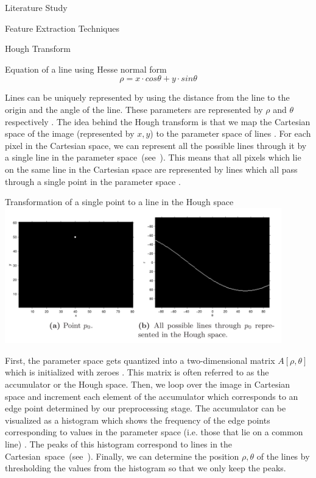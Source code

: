 \documentclass{matthijs}
\begin{document}
\begin{hoofdstuk}{Literature Study}
\begin{paragraaf}{Feature Extraction Techniques}
\begin{subparagraaf}{Hough Transform}
				\begin{figuur}{Equation of a line using Hesse normal form}
					\begin{equation*}
						\rho = x \cdot cos \theta + y \cdot sin \theta
					\end{equation*}\cite{caltech2009line}
				\end{figuur}

				Lines can be uniquely represented by using the distance from the line to the origin and the angle of the line.
				These parameters are represented by $\rho$ and $\theta$ respectively \cite{caltech2009line}.
				The idea behind the Hough transform is that we map the Cartesian space of the image (represented by $x,y$) to the parameter space of lines \cite{solberg2009hough}.
				For each pixel in the Cartesian space, we can represent all the possible lines through it by a single line in the parameter \mbox{space (see ).}
				This means that all pixels which lie on the same line in the Cartesian space are represented by lines which all pass through a single point in the parameter space \cite{kahl2000hough}.

				\begin{figuur}{Transformation of a single point to a line in the Hough space}
					\includegraphics[width=0.9\textwidth]{caltech2009line-img1.png}
					\cite{caltech2009line}
				\end{figuur}

				\bigskip

				First, the parameter space gets quantized into a two-dimensional matrix $ A[\rho,\theta] $ which is initialized with zeroes \cite{solberg2009hough}.
				This matrix is often referred to as the accumulator or the Hough space.
				Then, we loop over the image in Cartesian space and increment each element of the accumulator which corresponds to an edge point determined by our preprocessing stage.
				The accumulator can be visualized as a histogram which shows the frequency of the edge points corresponding to values in the parameter space (i.e. those that lie on a common line) \cite{kahl2000hough}.
				The peaks of this histogram correspond to lines in the \mbox{Cartesian space (see ).}
				Finally, we can determine the position $\rho,\theta$ of the lines by thresholding the values from the histogram so that we only keep the peaks.


\end{subparagraaf}
\end{paragraaf}
\end{hoofdstuk}
\end{document}
